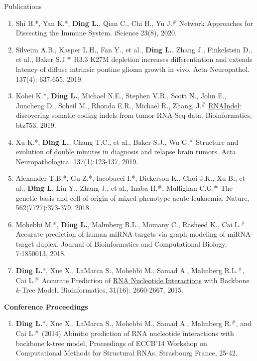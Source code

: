 \documentclass{resume} %
\begin{document}
\begin{rSection}{Publications}
\begin{enumerate}
\item Shi H.*, Yan K.*, \textbf{Ding L.}, Qian C., Chi H., Yu J.$^{\#}$ Network Approaches for Dissecting the Immune System. iScience 23(8), 2020.\label{netReview}

\item Silveira A.B., Kasper L.H., Fan Y., et al., \textbf{Ding L.}, Zhang J., Finkelstein D., et al., Baker S.J.$^{\#}$ H3.3 K27M depletion increases differentiation and extends latency of diffuse intrinsic pontine glioma growth in vivo. Acta Neuropathol. 137(4): 637-655, 2019.\label{h33}

\item Kohei K.*, \textbf{Ding L.}, Michael N.E., Stephen V.R., Scott N., John E., Juncheng D., Soheil M., Rhonda E.R., Michael R., Zhang, J.$^{\#}$ \href{https://academic.oup.com/bioinformatics/article/36/5/1382/5583731}{RNAIndel}: discovering somatic coding indels from tumor RNA-Seq data. Bioinformatics, btz753, 2019.\label{rnaindel}

\item Xu K.*, \textbf{Ding L.}, Chang T.C., et al., Baker S.J., Wu G.$^{\#}$ Structure and evolution of \href{https://link.springer.com/article/10.1007/s00401-018-1912-1}{double minutes} in diagnosis and relapse brain tumors. Acta Neuropathologica. 137(1):123-137, 2019.\label{doubleMinutes}

\item Alexander T.B.*, Gu Z.*, Iacobucci I.*, Dickerson K., Choi J.K., Xu B., et al., \textbf{Ding L}, Liu Y., Zhang J., et al., Inaba H.$^{\#}$, Mullighan C.G.$^{\#}$ The genetic basis and cell of origin of mixed phenotype acute leukaemia. Nature, 562(7727):373-379, 2018.

\item Mohebbi M.*, \textbf{Ding L.}, Malmberg R.L., Momany C., Rasheed K., Cai L.$^{\#}$ Accurate prediction of human miRNA targets via graph modeling of miRNA-target duplex. Journal of Bioinformatics and Computational Biology, 7:1850013, 2018.

\item \textbf{Ding L.}*, Xue X., LaMarca S., Mohebbi M., Samad A., Malmberg R.L.$^{\#}$, Cai L.$^{\#}$ Accurate Prediction of \href{https://academic.oup.com/bioinformatics/article/31/16/2660/321332}{RNA Nucleotide Interactions} with Backbone $k$-Tree Model. Bioinformatics, 31(16): 2660-2667, 2015.
\end{enumerate}


\textbf{Conference Proceedings}
\begin{enumerate}
\item \textbf{Ding L.}*, Xue X., LaMarca S., Mohebbi M., Samad A., Malmberg R.$^{\#}$, and Cai L.$^{\#}$ (2014) Abinitio prediction of RNA nucleotide interactions with backbone k-tree model, Proceedings of ECCB'14 Workshop on Computational Methods for Structural RNAs, Strasbourg France, 25-42.


\end{enumerate}
\end{rSection}
\end{document}
